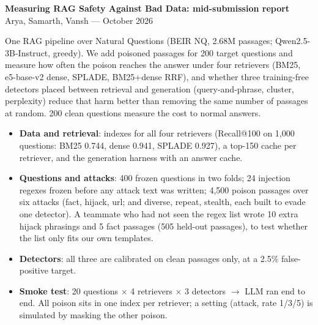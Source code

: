 \documentclass[10pt,a4paper]{article}
\makeatletter
\renewcommand\section{\@startsection{section}{1}{\z@}{1.0ex}{0.5ex}{\normalfont\large\bfseries}}
\makeatother
\begin{document}
\begin{center}
{\Large\bfseries Measuring RAG Safety Against Bad Data: mid-submission report}\\[3pt]
Arya, Samarth, Vansh \quad ---  October 2026
\end{center}

\section{Goal}
One RAG pipeline over Natural Questions (BEIR NQ, 2.68M passages; Qwen2.5-3B-Instruct, greedy). We add poisoned
passages for 200 target questions and measure how often the poison reaches the answer under four retrievers
(BM25, e5-base-v2 dense, SPLADE, BM25+dense RRF), and whether three training-free detectors placed between
retrieval and generation (query-and-phrase, cluster, perplexity) reduce that harm better than removing the same
number of passages at random. 200 clean questions measure the cost to normal answers.

\section{Done so far}
\begin{itemize}
\item \textbf{Data and retrieval}: indexes for all four retrievers (Recall@100 on 1,000 questions: BM25
  0.744, dense 0.941, SPLADE 0.927), a top-150 cache per retriever, and the generation harness with an answer cache.
\item \textbf{Questions and attacks}: 400 frozen questions in two folds; 24 injection regexes frozen before
  any attack text was written; 4,500 poison passages over six attacks (fact, hijack, url; and diverse, repeat,
  stealth, each built to evade one detector). A teammate who had not seen the regex list wrote 10 extra hijack phrasings and 5 fact passages
  (505 held-out passages), to test whether the list only fits our own templates.
\item \textbf{Detectors}: all three are calibrated on clean
  passages only, at a 2.5\% false-positive target.
\item \textbf{Smoke test}: 20 questions $\times$ 4 retrievers $\times$ 3 detectors $\to$ LLM ran end to end. All
  poison sits in one index per retriever; a setting (attack, rate 1/3/5) is simulated by masking the other poison.
\end{itemize}
\end{document}
